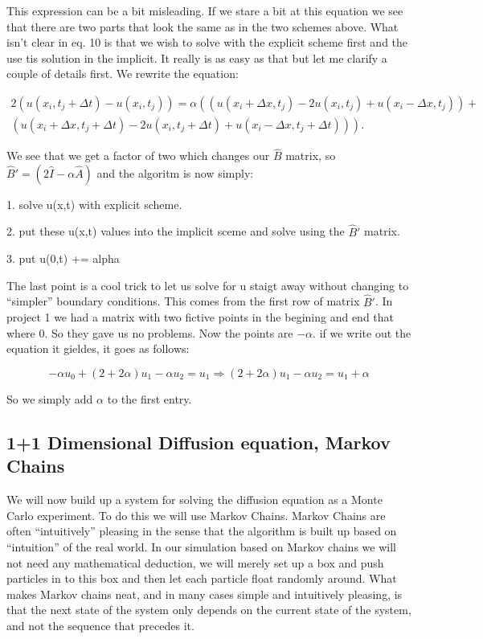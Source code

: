 \documentclass[english,a4paper,12pt]{article}
\begin{document}
This expression can be a bit misleading. If we stare a bit at this equation we see that there are two parts that look the same as
in the two schemes above. What isn't clear in eq. 10 is that we wish to solve with the explicit scheme first and the use tis solution
in the implicit. It really is as easy as that but let me clarify a couple of details first. We rewrite the equation:

\begin{equation}
\begin{split}
2(u(x_i,t_j+\Delta t)-u(x_i,t_j)) = \alpha\left( (u(x_i+\Delta x,t_j)-2u(x_i,t_j)+u(x_i-\Delta x,t_j)) +\right. \\
\left. (u(x_i+\Delta x,t_j+\Delta t)-2u(x_i,t_j+\Delta t)+u(x_i-\Delta x,t_j+\Delta t)) \right).
\end{split}
\end{equation}

We see that we get a factor of two which changes our $\hat B$ matrix, so $ \hat B' = (2 \hat I -\alpha \hat A)$
and the algoritm is now simply:

1. solve u(x,t) with explicit scheme.

2. put these u(x,t) values into the implicit sceme and solve using the $\hat B'$ matrix.

3. put u(0,t) += alpha

The last point is a cool trick to let us solve for u staigt away without changing to ``simpler'' boundary conditions.
This comes from the first row of matrix $\hat B'$. In project 1 we had a matrix with two fictive points in the begining and end
that where 0. So they gave us no problems. Now the points are $-\alpha$. if we write out the equation it gieldes, it goes as follows:

\begin{equation}
-\alpha u_0 + (2+2\alpha) u_1 - \alpha u_2 = u_1 \Rightarrow (2+2\alpha) u_1 - \alpha u_2 = u_1 + \alpha
\end{equation}

So we simply add $\alpha$ to the first entry.

\subsection*{1+1 Dimensional Diffusion equation, Markov Chains}

We will now build up a system for solving the diffusion equation as a Monte Carlo experiment. To do this we will use Markov Chains.
Markov Chains are often ``intuitively'' pleasing in the sense that the algorithm is built up based on ``intuition'' of the real world.
In our simulation based on Markov chains we will not need any mathematical deduction, we will merely set up a box and push particles in
to this box and then let each particle float randomly around. What makes Markov chains neat, and in many cases simple and intuitively pleasing,
is that the next state of the system only depends on the current state of the system, and not the sequence that precedes it.
\end{document}
